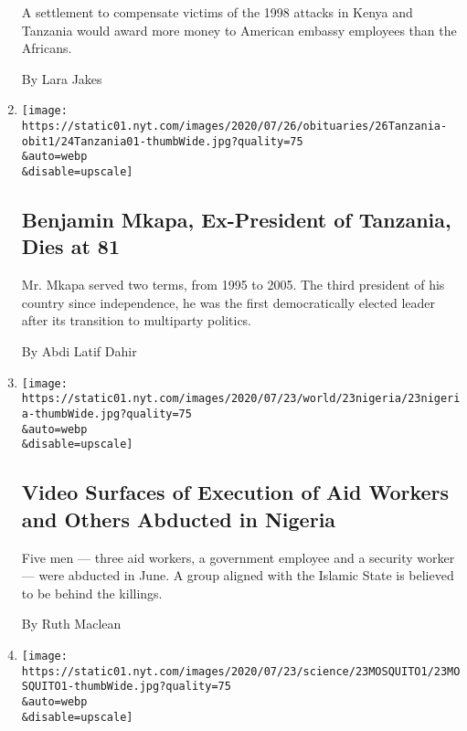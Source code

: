 \begin{enumerate}
  A settlement to compensate victims of the 1998 attacks in Kenya and
  Tanzania would award more money to American embassy employees than the
  Africans.

  By Lara Jakes
\item
  \href{/2020/07/24/world/africa/benjamin-mkapa-dead.html}{}

  \texttt{[image: https://static01.nyt.com/images/2020/07/26/obituaries/26Tanzania-obit1/24Tanzania01-thumbWide.jpg?quality=75\\\&auto=webp\\\&disable=upscale]}

  \hypertarget{benjamin-mkapa-ex-president-of-tanzania-dies-at-81}{%
  \subsection{Benjamin Mkapa, Ex-President of Tanzania, Dies at
  81}\label{benjamin-mkapa-ex-president-of-tanzania-dies-at-81}}

  Mr. Mkapa served two terms, from 1995 to 2005. The third president of
  his country since independence, he was the first democratically
  elected leader after its transition to multiparty politics.

  By Abdi Latif Dahir
\item
  \href{/2020/07/23/world/africa/aid-workers-executed-nigeria.html}{}

  \texttt{[image: https://static01.nyt.com/images/2020/07/23/world/23nigeria/23nigeria-thumbWide.jpg?quality=75\\\&auto=webp\\\&disable=upscale]}

  \hypertarget{video-surfaces-of-execution-of-aid-workers-and-others-abducted-in-nigeria}{%
  \subsection{Video Surfaces of Execution of Aid Workers and Others
  Abducted in
  Nigeria}\label{video-surfaces-of-execution-of-aid-workers-and-others-abducted-in-nigeria}}

  Five men --- three aid workers, a government employee and a security
  worker --- were abducted in June. A group aligned with the Islamic
  State is believed to be behind the killings.

  By Ruth Maclean
\item
  \href{/2020/07/23/science/mosquitoes-genetics-africa.html}{}

  \texttt{[image: https://static01.nyt.com/images/2020/07/23/science/23MOSQUITO1/23MOSQUITO1-thumbWide.jpg?quality=75\\\&auto=webp\\\&disable=upscale]}


\end{enumerate}
